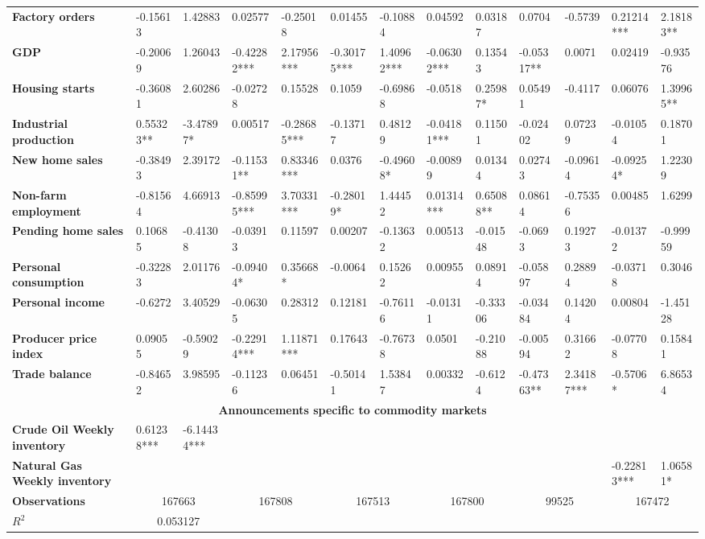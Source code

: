 \begin{sidewaystable}
{\begin{tabular}{@{}lllllllllllll@{}}
\textbf{Factory orders}& -0.15613 & 1.42883 & 0.02577 & -0.25018 & 0.01455 & -0.10884 & 0.04592 & 0.03187 & 0.0704 & -0.5739 & 0.21214*** & 2.18183** \\ \textbf{GDP}& -0.20069 & 1.26043 & -0.42282*** & 2.17956*** & -0.30175*** & 1.40962*** & -0.06302*** & 0.13543 & -0.05317** & 0.0071 & 0.02419 & -0.93576 \\ \textbf{Housing starts}& -0.36081 & 2.60286 & -0.02728 & 0.15528 & 0.1059 & -0.69868 & -0.0518 & 0.25987* & 0.05491 & -0.4117 & 0.06076 & 1.39965** \\ \textbf{Industrial production}& 0.55323**& -3.47897*& 0.00517 & -0.28685*** & -0.13717 & 0.48129 & -0.04181*** & 0.11501 & -0.02402 & 0.07239 & -0.01054 & 0.18701 \\ \textbf{New home sales}& -0.38493 & 2.39172 & -0.11531**& 0.83346***& 0.0376 & -0.49608* & -0.00899 & 0.01344 & 0.02743 & -0.09614 & -0.09254* & 1.22309 \\ \textbf{Non-farm employment}& -0.81564 & 4.66913 & -0.85995*** & 3.70331*** & -0.28019* & 1.44452 & 0.01314*** & 0.65088** & 0.08614 & -0.75356 & 0.00485 & 1.6299 \\ \textbf{Pending home sales}& 0.10685 & -0.41308 & -0.03913 & 0.11597 & 0.00207 & -0.13632 & 0.00513 & -0.01548 & -0.0693 & 0.19273 & -0.01372 & -0.99959 \\ \textbf{Personal consumption}& -0.32283 & 2.01176 & -0.09404* & 0.35668* & -0.0064 & 0.15262 & 0.00955 & 0.08914 & -0.05897 & 0.28894 & -0.03718 & 0.3046 \\ \textbf{Personal income}& -0.6272 & 3.40529 & -0.06305 & 0.28312 & 0.12181 & -0.76116 & -0.01311 & -0.33306 & -0.03484 & 0.14204 & 0.00804 & -1.45128 \\ \textbf{Producer price index}& 0.09055 & -0.59029 & -0.22914*** & 1.11871*** & 0.17643 & -0.76738 & 0.0501 & -0.21088 & -0.00594 & 0.31662 & -0.07708 & 0.15841 \\ \textbf{Trade balance}& -0.84652 & 3.98595 & -0.11236 & 0.06451 & -0.50141 & 1.53847 & 0.00332 & -0.6124 & -0.47363** & 2.34187*** & -0.5706* & 6.86534 \\  \midrule \multicolumn{13}{c}{\textbf{Announcements specific to commodity markets}} \\ \midrule \textbf{Crude Oil Weekly inventory}& 0.61238*** & -6.14434*** &  &  &  &  &  &  &  &  &  &  \\ \textbf{Natural Gas Weekly inventory}&  &  &  &  &  &  &  &  &  &  & -0.22813*** & 1.06581* \\  \midrule \textbf{Observations}             &\multicolumn{2}{c}{ 167663 }                                                 & \multicolumn{2}{c}{ 167808 }                                                 & \multicolumn{2}{c}{ 167513 }                                                 & \multicolumn{2}{c}{ 167800 }                                                 & \multicolumn{2}{c}{ 99525 }                                                   & \multicolumn{2}{c}{ 167472 }                                                 \\ \textbf{$R^2$}             &\multicolumn{2}{c}{ 0.053127 }                                                 & 
\end{tabular}}
\end{sidewaystable}
